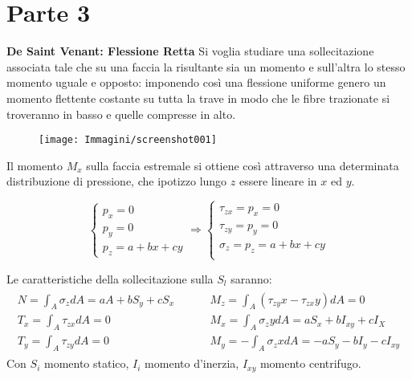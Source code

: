 \documentclass{article}
\def\outcome{\textbf{Learning Outcomes:} Outcomes go here. }
\begin{document}
	\section*{Parte 3} %

\begin{adjustwidth}{2in}{} 
	
\textbf{{\Large De Saint Venant: Flessione Retta}} \mbox{} \newline
		Si voglia studiare una sollecitazione associata tale che su una faccia la risultante  sia un momento e sull'altra lo stesso momento uguale e opposto: imponendo così una flessione uniforme genero un momento flettente costante su tutta la trave in modo che le fibre trazionate si troveranno in basso e quelle compresse in alto. 
		
\begin{figure}[H]
	\centering
	\texttt{[image: Immagini/screenshot001]}
	\label{fig:screenshot001}
\end{figure}


		Il momento $M_x$ sulla faccia estremale si ottiene così attraverso una determinata distribuzione di pressione, che ipotizzo lungo $z$ essere lineare in $ x $ ed $ y $. 
		
		\[\begin{cases}
			p_x = 0 \\
			p_y = 0 \\
			p_z = a + bx + cy\end{cases} \Rightarrow \begin{cases}
			\tau_{zx} = p_x = 0 \\
			\tau_{zy} = p_y = 0 \\
			\sigma_z = p_z =  a + bx + cy  \\
		\end{cases}  \] 

		Le caratteristiche della sollecitazione sulla $S_l$ saranno:
		\[\begin{matrix}
			\begin{aligned}
				N = \int_A \sigma_zdA = aA + bS_y + cS_x  \hspace{1cm} & M_z = \int_A (\tau_{zy}x -\tau_{zx}y)dA = 0 \\
				T_x = \int_A \tau_{zx}dA = 0 \hspace{1cm} & M_x = \int_A \sigma_zydA = aS_x + bI_{xy} + cI_X \\
				T_y = \int_A \tau_{zy}dA = 0 \hspace{1cm} & M_y = -\int_A \sigma_zxdA = -aS_y - bI_y - cI_{xy}
			\end{aligned}	
		\end{matrix}\]
		Con $S_i$ momento statico, $I_i$ momento d'inerzia, $I_{xy}$ momento centrifugo.
		

\end{adjustwidth}
\end{document}
